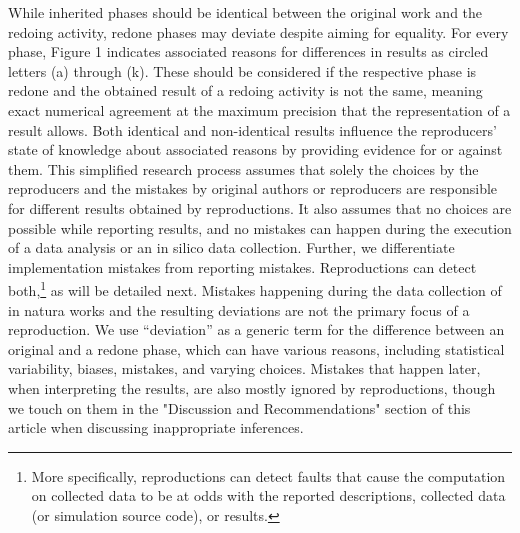 \documentclass[authordate, meta]{jote-new-article}
\begin{document}
	While inherited phases should be identical between the original work and the redoing activity, redone phases may deviate despite aiming for equality. For every phase, Figure 1 indicates associated reasons for differences in results as circled letters (a) through (k). These should be considered if the respective phase is redone and the obtained result of a redoing activity is not the same, meaning exact numerical agreement at the maximum precision that the representation of a result allows. Both identical and non-identical results influence the reproducers' state of knowledge about associated reasons by providing evidence for or against them. This simplified research process assumes that solely the choices by the reproducers and the mistakes by original authors or reproducers are responsible for different results obtained by reproductions. It also assumes that no choices are possible while reporting results, and no mistakes can happen during the execution of a data analysis or an in silico data collection. Further, we differentiate implementation mistakes from reporting mistakes. Reproductions can detect both,\footnote{ More specifically, reproductions can detect faults that cause the computation on collected data to be at odds with the reported descriptions, collected data (or simulation source code), or results.} as will be detailed next. Mistakes happening during the data collection of in natura works and the resulting deviations are not the primary focus of a reproduction. We use “deviation” as a generic term for the difference between an original and a redone phase, which can have various reasons, including statistical variability, biases, mistakes, and varying choices. Mistakes that happen later, when interpreting the results, are also mostly ignored by reproductions, though we touch on them in the "Discussion and Recommendations" section of this article when discussing inappropriate inferences.
\end{document}
